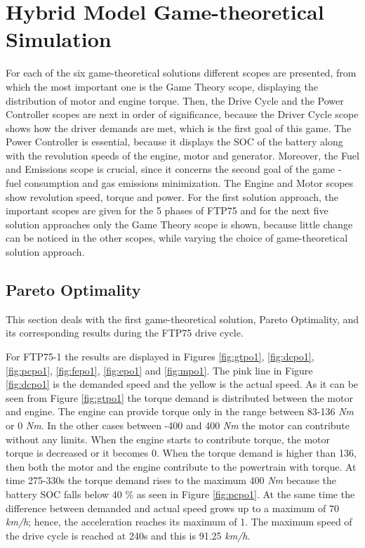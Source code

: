\section{Hybrid Model Game-theoretical Simulation}

For each of the six game-theoretical solutions different scopes are presented, from which the most important one is the Game Theory scope, displaying the distribution of motor and engine torque. Then, the Drive Cycle and the Power Controller scopes are next in order of significance, because the Driver Cycle scope shows how the driver demands are met, which is the first goal of this game. The Power Controller is essential, because it displays the SOC of the battery along with the revolution speeds of the engine, motor and generator. Moreover, the Fuel and Emissions scope is crucial, since it concerns the second goal of the game - fuel consumption and gas emissions minimization. The Engine and Motor scopes show revolution speed, torque and power. For the first solution approach, the important scopes are given for the 5 phases of FTP75 and for the next five solution approaches only the Game Theory scope is shown, because little change can be noticed in the other scopes, while varying the choice of game-theoretical solution approach.

\subsection{Pareto Optimality}
This section deals with the first game-theoretical solution, Pareto Optimality, and its corresponding results during the FTP75 drive cycle. 

For FTP75-1 the results are displayed in Figures \ref{fig:gtpo1}, \ref{fig:dcpo1}, \ref{fig:pcpo1}, \ref{fig:fepo1}, \ref{fig:epo1} and \ref{fig:mpo1}. The pink line in Figure \ref{fig:dcpo1} is the demanded speed and the yellow is the actual speed. As it can be seen from Figure \ref{fig:gtpo1} the torque demand is distributed between the motor and engine. The engine can provide torque only in the range between 83-136 \textit{Nm} or 0 \textit{Nm}. In the other cases between -400 and 400 \textit{Nm} the motor can contribute without any limits. When the engine starts to contribute torque, the motor torque is decreased or it becomes 0. When the torque demand is higher than 136, then both the motor and the engine contribute to the powertrain with torque. At time 275-330s the torque demand rises to the maximum 400 \textit{Nm} because the battery SOC falls below 40 \% as seen in Figure \ref{fig:pcpo1}. At the same time the difference between demanded and actual speed grows up to a maximum of 70 \textit{km/h}; hence, the acceleration reaches its maximum of 1. The maximum speed of the drive cycle is reached at 240s and this is 91.25 \textit{km/h}. 

